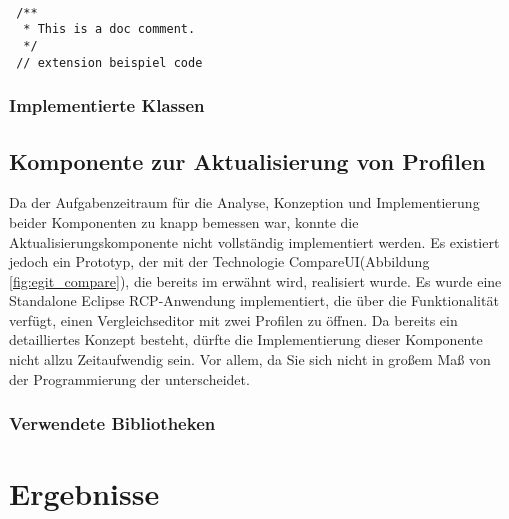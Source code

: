 {{{{ \begin{lstlisting}[caption={Toolbar Extension},label=lst:extension]
 
 /**
  * This is a doc comment.
  */
 // extension beispiel code
 \end{lstlisting}


}

\subsubsection{Implementierte Klassen}{

}







}

\subsection{Komponente zur Aktualisierung von Profilen}{
\label{sec:impl_aktualisieren}
Da der Aufgabenzeitraum für die Analyse, Konzeption und Implementierung beider Komponenten zu knapp bemessen war, konnte die Aktualisierungskomponente nicht vollständig implementiert werden. Es existiert jedoch ein Prototyp, der mit der Technologie CompareUI(Abbildung \ref{fig:egit_compare}), die bereits im  erwähnt wird, realisiert wurde. Es wurde eine Standalone Eclipse \ac{RCP}-Anwendung implementiert, die über die Funktionalität verfügt, einen Vergleichseditor mit zwei Profilen zu öffnen. Da bereits ein detailliertes Konzept besteht, dürfte die Implementierung dieser Komponente nicht allzu Zeitaufwendig sein. Vor allem, da Sie sich nicht in großem Maß von der Programmierung der  unterscheidet.    


}



\subsubsection{Verwendete Bibliotheken}{

}



}


\section{Ergebnisse}{
\label{sec:ergebnisse}


}




}

